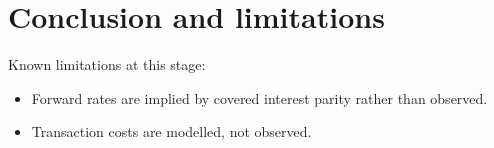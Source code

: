 \section{Conclusion and limitations}\label{sec:conclusion}


Known limitations at this stage:
\begin{itemize}
  \item Forward rates are implied by covered interest parity rather than observed.
  \item Transaction costs are modelled, not observed.
\end{itemize}
